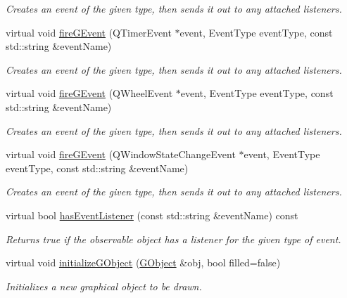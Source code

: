 \begin{DoxyCompactItemize}
\begin{DoxyCompactList}\small\item\em Creates an event of the given type, then sends it out to any attached listeners. \end{DoxyCompactList}\item 
virtual void \mbox{\hyperlink{classGObservable_a741345310d9b7c5170a6cbc410c44ac4}{fire\+G\+Event}} (Q\+Timer\+Event $\ast$event, Event\+Type event\+Type, const std\+::string \&event\+Name)
\begin{DoxyCompactList}\small\item\em Creates an event of the given type, then sends it out to any attached listeners. \end{DoxyCompactList}\item 
virtual void \mbox{\hyperlink{classGObservable_a93bf338968a0338761b8e4dc62f582e9}{fire\+G\+Event}} (Q\+Wheel\+Event $\ast$event, Event\+Type event\+Type, const std\+::string \&event\+Name)
\begin{DoxyCompactList}\small\item\em Creates an event of the given type, then sends it out to any attached listeners. \end{DoxyCompactList}\item 
virtual void \mbox{\hyperlink{classGObservable_a2a70a7d7435ff0c3b80bb4d70da19e0d}{fire\+G\+Event}} (Q\+Window\+State\+Change\+Event $\ast$event, Event\+Type event\+Type, const std\+::string \&event\+Name)
\begin{DoxyCompactList}\small\item\em Creates an event of the given type, then sends it out to any attached listeners. \end{DoxyCompactList}\item 
virtual bool \mbox{\hyperlink{classGObservable_a9f6faaa25942923bafa1c44020c49fa9}{has\+Event\+Listener}} (const std\+::string \&event\+Name) const
\begin{DoxyCompactList}\small\item\em Returns true if the observable object has a listener for the given type of event. \end{DoxyCompactList}\item 
virtual void \mbox{\hyperlink{classGDrawingSurface_a814498efebc5586645159cd22990cf61}{initialize\+G\+Object}} (\mbox{\hyperlink{classGObject}{G\+Object}} \&obj, bool filled=false)
\begin{DoxyCompactList}\small\item\em Initializes a new graphical object to be drawn. \end{DoxyCompactList}\item 

\end{DoxyCompactItemize}
